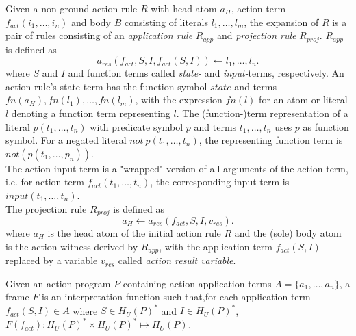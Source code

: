\begin{definition}
Given a non-ground action rule $R$ with head atom $a_H$, action term $f_{act}(i_1,\ldots,i_n)$ and body  $B$ consisting of literals $l_1,\ldots,l_m$, the expansion of $R$ is a pair of rules consisting of an \emph{application rule} $R_{app}$ and \emph{projection rule} $R_{proj}$. $R_{app}$ is defined as
\[
	a_{res}(f_{act}, S, I, f_{act}(S, I)) \leftarrow l_1,\ldots,l_n.
\]
where $S$ and $I$ and function terms called \emph{state-} and \emph{input-}terms, respectively.
An action rule's state term has the function symbol $\mathit{state}$ and terms $fn(a_H), fn(l_1),\ldots,fn(l_m)$, with the expression $fn(l)$ for an atom or literal $l$ denoting a function term representing $l$. The (function-)term representation of a literal $p(t_1,\ldots,t_n)$ with predicate symbol $p$ and terms $t_1,\ldots,t_n$ uses $p$ as function symbol. For a negated literal $\mathit{not}~p(t_1,\ldots,t_n)$, the representing function term is $not(p(t_1,\ldots,p_n))$. \\
The action input term is a "wrapped" version of all arguments of the action term, i.e. for action term $f_{act}(t_1,\ldots,t_n)$, the corresponding input term is $input(t_1,\ldots,t_n)$. \\
The projection rule $R_{proj}$ is defined as
\[
	a_H \leftarrow a_{res}(f_{act}, S, I, v_{res}).
\]
where $a_H$ is the head atom of the initial action rule $R$ and the (sole) body atom is the action witness derived by $R_{app}$, with the application term $f_{act}(S, I)$ replaced by a variable $v_{res}$ called \emph{action result variable}.
\end{definition}



\begin{definition}[Frame]
Given an action program $P$ containing action application terms $A = \{a_1,\ldots,a_n\}$, a frame $F$ is an interpretation function such that,for each application term $f_{act}(S, I) \in A$ where $S \in H_{U}(P)^{*}$ and $I \in H_{U}(P)^{*}$, $F(f_{act}): H_{U}(P)^{*} \times H_{U}(P)^{*} \mapsto H_{U}(P)$.
\end{definition}


